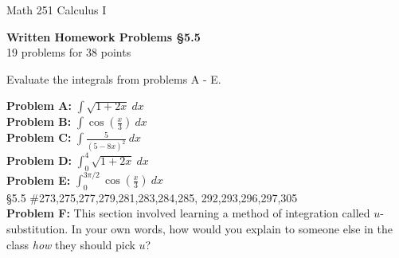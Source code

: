 \documentclass[11pt]{report}
\theoremstyle{plain}
\begin{document}
\hfill Math 251 Calculus I
\begin{center}
\Large{\textbf{Written Homework Problems \S 5.5}} \\
19 problems for 38 points\\
\end{center}


Evaluate the integrals from problems A - E.
	
\textbf{Problem A:} $\displaystyle \int \sqrt{1+2x} \: dx $\\

\textbf{Problem B:} $\displaystyle \int \cos\left( \frac{x}{3} \right) \: dx$\\

\textbf{Problem C:} $\displaystyle \int \frac{5}{(5-8x)^2} \: dx$\\

\textbf{Problem D:} $\displaystyle \int_0^4  \sqrt{1+2x} \: dx $\\

\textbf{Problem E:} $\displaystyle \int_0^{3 \pi /2} \cos\left( \frac{x}{3} \right) \: dx$\\
	
{\S 5.5} \#273,275,277,279,281,283,284,285, 292,293,296,297,305\\


\textbf{Problem F:} This section involved learning a method of integration called $u$-substitution. In your own words, how would you explain to someone else in the class \emph{how} they should pick $u$? 
\end{document}
